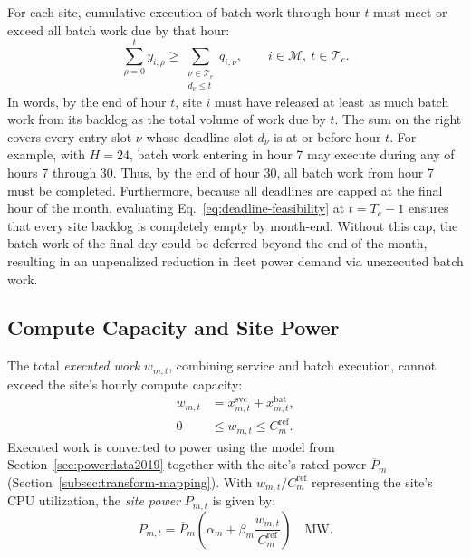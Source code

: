 \documentclass{UNCC-thesis}
\begin{document}
For each site, cumulative
execution of batch work through hour \(t\) must meet
or exceed all batch work due by that hour:
\begin{equation}
  \sum_{\rho=0}^{t}y_{i,\rho}
  \geq
  \sum_{\substack{\nu\in\mathcal T_e\\d_{\nu}\leq t}}q_{i,\nu},
  \qquad i\in\mathcal M,\ t\in\mathcal T_e.
  \label{eq:deadline-feasibility}
\end{equation}
In words, by the end of hour \(t\), site \(i\) must have released at least as much
batch work from its backlog as the total volume of work due by \(t\). The sum on the
right covers every entry slot \(\nu\) whose deadline slot \(d_\nu\) is at or before
hour \(t\). For example,
with \(H=24\), batch work entering in hour 7 may execute during any of hours 7 through
30. Thus, by the end of hour 30, all batch work from hour 7 must be completed.
Furthermore, because all deadlines are capped at the final hour of the month,
evaluating Eq.~\eqref{eq:deadline-feasibility} at \(t=T_e-1\) ensures that every site
backlog is completely empty by month-end. Without this cap, the batch work of the final
day could be deferred beyond the end of the month, resulting in an unpenalized reduction
in fleet power demand via unexecuted batch work.

\subsection{Compute Capacity and Site Power}
\label{subsec:problem-feasibility}

The total \emph{executed work} \(w_{m,t}\), combining service and batch execution, cannot
exceed the site's hourly compute capacity:
\begin{align}
  w_{m,t}
  &=
  x^{\mathrm{svc}}_{m,t}
  +x^{\mathrm{bat}}_{m,t},
  \label{eq:executed-work}\\
  0
  &\leq w_{m,t}\leq C^{\mathrm{ref}}_m.
  \label{eq:site-capacity}
\end{align}
Executed work is converted to power using the model from
Section~\ref{sec:powerdata2019} together with the site's rated power
\(\overline P_m\) (Section~\ref{subsec:transform-mapping}). With
\(w_{m,t}/C^{\mathrm{ref}}_m\) representing the site's CPU utilization, the
\emph{site power} \(P_{m,t}\) is given by:
\begin{equation}
  P_{m,t}
  =
  \overline P_m
  \left(
    \alpha_m+\beta_m\frac{w_{m,t}}{C^{\mathrm{ref}}_m}
  \right)
  \quad\mathrm{MW}.
  \label{eq:runtime-power}
\end{equation}
\end{document}
